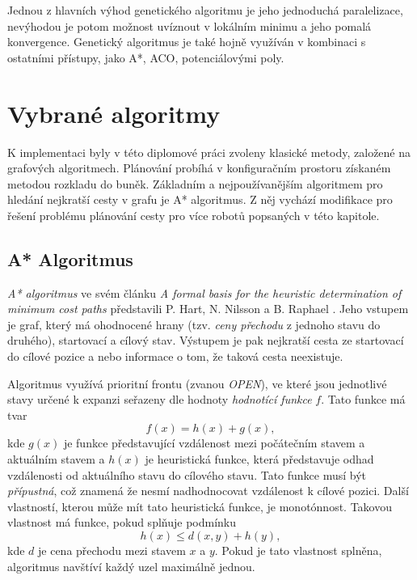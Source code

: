 Jednou z hlavních výhod genetického algoritmu je jeho jednoduchá paralelizace, nevýhodou je potom možnost uvíznout v lokálním minimu a jeho pomalá konvergence. Genetický algoritmus je také hojně využíván v kombinaci s ostatními přístupy, jako A*, ACO, potenciálovými poly. \cite{Lamini2018,Masehian2007,Gao2008,Alajlan2013}


\clearpage
\chapter{Vybrané algoritmy}\label{sec:algos}

K implementaci byly v této diplomové práci zvoleny klasické metody, založené na grafových algoritmech. Plánování probíhá v konfiguračním prostoru získaném metodou rozkladu do buněk. Základním a nejpoužívanějším algoritmem pro hledání nejkratší cesty v grafu je A* algoritmus. Z něj vychází modifikace pro řešení problému plánování cesty pro více robotů popsaných v této kapitole.

\section{A* Algoritmus}\label{sec:Astar}
\emph{A* algoritmus} ve svém článku \emph{A formal basis for the heuristic determination of minimum cost paths} představili P. Hart, N. Nilsson a B. Raphael \cite{Hart1968}. Jeho vstupem je graf, který má ohodnocené hrany (tzv. \emph{ceny přechodu} z jednoho stavu do druhého), startovací a cílový stav. Výstupem je pak nejkratší cesta ze startovací do cílové pozice a nebo informace o tom, že taková cesta neexistuje. 

Algoritmus využívá prioritní frontu (zvanou \emph{OPEN}), ve které jsou jednotlivé stavy určené k expanzi seřazeny dle hodnoty \emph{hodnotící funkce} $f$. Tato funkce má tvar
\begin{equation}
	f\left(x\right) = h\left(x\right) + g\left(x\right),
\end{equation}
kde $ g\left(x\right)$ je funkce představující vzdálenost mezi počátečním stavem a aktuálním stavem a $h\left(x\right)$ je heuristická funkce, která představuje odhad vzdálenosti od aktuálního stavu do cílového stavu. Tato funkce musí být \emph{přípustná}, což znamená že nesmí nadhodnocovat vzdálenost k cílové pozici. Další vlastností, kterou může mít tato heuristická funkce, je monotónnost. Takovou vlastnost má funkce, pokud splňuje podmínku
\begin{equation}
	h\left(x\right)\leq d\left(x,y\right) + h\left(y\right),
\end{equation}
kde $d$ je cena přechodu mezi stavem $x$ a $y$. Pokud je tato vlastnost splněna, algoritmus navštíví každý uzel maximálně jednou.

